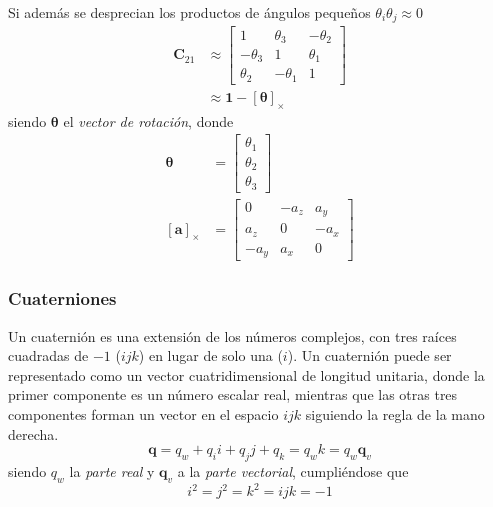Si además se desprecian los productos de ángulos pequeños $\theta_i\theta_j \approx 0$
\begin{align}
    \bm{C}_{21} &\approx
    \begin{bmatrix}
        1 & \theta_3 & -\theta_2 \\
        -\theta_3 & 1 & \theta_1 \\
        \theta_2 & -\theta_1 & 1
    \end{bmatrix}
    \label{eq:rpyinfinitesimalreduced}
    \\
    &\approx \bm{1} - \left[\bm{\theta}\right]_\times
\end{align}
siendo $\bm{\theta}$ el \textit{vector de rotación}, donde
\begin{align}
    \bm{\theta} &=
    \begin{bmatrix}
        \theta_1 \\
        \theta_2 \\
        \theta_3
    \end{bmatrix}
    \\
    \left[\bm{a}\right]_\times &= 
    \begin{bmatrix}
        0 & -a_z & a_y \\
        a_z & 0 & -a_x \\
        -a_y & a_x & 0
    \end{bmatrix}
\end{align}

\subsubsection{Cuaterniones}
Un cuaternión es una extensión de los números complejos, con tres raíces cuadradas de $-1$ ($ijk$) en lugar de solo una ($i$). Un cuaternión puede ser representado como un vector cuatridimensional de longitud unitaria, donde la primer componente es un número escalar real, mientras que las otras tres componentes forman un vector en el espacio $ijk$ siguiendo la regla de la mano derecha. 
\begin{equation}
    \bm{q} = q_w + q_i i + q_j j + q_k = q_w k = q_w \bm{q}_v
\end{equation}
siendo $q_w$ la \textit{parte real} y $\bm{q}_v$ a la \textit{parte vectorial}, cumpliéndose que
\begin{equation}
    i^2=j^2=k^2=ijk=-1
\end{equation}

